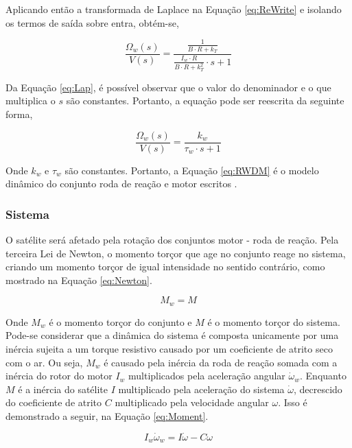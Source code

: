 \documentclass[
	12pt,				%
	openany,			%
	twoside,			%
	a4paper,			%
	english,			%
	french,				%
	spanish,			%
	brazil,				%
	oldfontcommands
	]{abntex2}
\begin{document}
Aplicando então a transformada de Laplace na Equação \ref{eq:ReWrite} e isolando os termos de saída sobre entra, obtém-se,

\begin{equation}
\frac{\Omega_{w}(s)}{V(s)} = \frac{\frac{1}{B \cdot R + k_{T}}}{\frac{I_{w} \cdot R}{B \cdot R + k_{T}^{2}} \cdot s +1}
\label{eq:Lap}
\end{equation}

Da Equação \ref{eq:Lap}, é possível observar que o valor do denominador e o que multiplica o $s$ são constantes. Portanto, a equação pode ser reescrita da seguinte forma,

\begin{equation}
\frac{\Omega_{w}(s)}{V(s)} = \frac{k_{w}}{\tau_{w} \cdot s +1}
\label{eq:RWDM}
\end{equation}

Onde $k_{w}$ e $\tau_{w}$ são constantes. Portanto, a Equação \ref{eq:RWDM} é o modelo dinâmico do conjunto roda de reação e motor escritos \cite{Ericksson}.

\subsubsection{Sistema}

O satélite será afetado pela rotação dos conjuntos motor - roda de reação. Pela terceira Lei de Newton, o momento torçor que age no conjunto reage no sistema, criando um momento torçor de igual intensidade no sentido contrário, como mostrado na Equação \ref{eq:Newton}.

\begin{equation}
M_{w} = M
\label{eq:Newton}
\end{equation}

Onde $M_{w}$ é o momento torçor do conjunto e $M$ é o momento torçor do sistema. Pode-se considerar que a dinâmica do sistema é composta unicamente por uma inércia sujeita a um torque resistivo causado por um coeficiente de atrito seco com o ar. Ou seja, $M_{w}$ é causado pela inércia da roda de reação somada com a inércia do rotor do motor $I_{w}$ multiplicados pela aceleração angular $\dot{\omega}_{w}$. Enquanto $M$ é a inércia do satélite $I$ multiplicado pela aceleração do sistema $\dot{\omega}$,  decrescido do coeficiente de atrito $C$ multiplicado pela velocidade angular $\omega$. Isso é demonstrado a seguir, na Equação \ref{eq:Moment}.

\begin{equation}
I_{w}\dot{\omega}_{w} = I\dot{\omega} - C\omega
\label{eq:Moment}
\end{equation}
\end{document}
